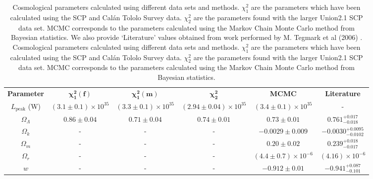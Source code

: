 \documentclass[twocolumn]{revtex4}
\begin{document}
{\renewcommand{\arraystretch}{1.2}%
\begin{table}[t]
\centering
\begin{tabular}{c@{\hskip 15pt}c@{\hskip 15pt}c@{\hskip 15pt}c@{\hskip 15pt}c@{\hskip 15pt}c} 
 \hline
 \textbf{Parameter} & \textbf{$\boldsymbol{\chi^2_{1}(f)}$} & \textbf{$\boldsymbol{\chi^2_{1}(m)}$} & \textbf{$\boldsymbol{\chi^2_2}$} & \textbf{MCMC} & \textbf{Literature} \\ [0.5ex] 
 $L_{\text{peak}}$ (W) & $(3.1\pm0.1)\times 10^{35}$ & $(3.3\pm0.1)\times 10^{35}$ & $(2.94\pm0.04)\times 10^{35}$ & $(3.4\pm0.1 ) \times 10^{35}$ & -\\
 $\Omega_\Lambda$ & $0.86\pm0.04$ &  $0.71\pm0.04$ & $0.74\pm0.01$ & $0.73\pm0.01$ & $0.761^{+0.017}_{-0.018}$ \\
 $\Omega_k$ & - & - & - & $-0.0029\pm0.009$ & $-0.0030^{+0.0095}_{-0.0102}$ \\
 $\Omega_m$ & - & - & - & $0.20\pm0.02$ & $0.239^{+0.018}_{-0.017}$ \\
 $\Omega_r$ & - & - & - & $(4.4\pm0.7)\times10^{-6}$ & $(4.16)\times10^{-6}$ \\
 $w$ & - & - & - & $-0.912\pm0.01$ & $-0.941^{+0.087}_{-0.101}$ \\
 \hline
\end{tabular}
\caption{Cosmological parameters calculated using different data sets and methods. $\chi^2_1$ are the parameters which have been calculated using the SCP and Cal\'{a}n Tololo Survey data. $\chi^2_2$ are the parameters found with the larger Union2.1 SCP data set. MCMC corresponds to the parameters calculated using the Markov Chain Monte Carlo method from Bayesian statistics. We also provide `Literature' values obtained from work performed by M. Tegmark et al (2006) \cite{cosmo_constraints}. 
Cosmological parameters calculated using different data sets and methods. $\chi^2_1$ are the parameters which have been calculated using the SCP and Cal\'{a}n Tololo Survey data. $\chi^2_2$ are the parameters found with the larger Union2.1 SCP data set. MCMC corresponds to the parameters calculated using the Markov Chain Monte Carlo method from Bayesian statistics. }
\vspace{-0.5em}
\label{table:cosmo_parameters}
\end{table}

}
\end{document}
